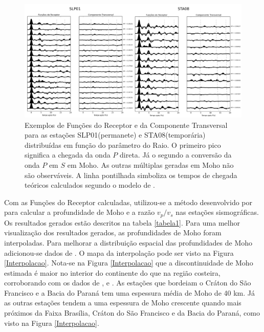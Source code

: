 \begin{figure}[!ht]
\centering
\includegraphics[scale=0.16]{Figs/RF_SLP01_STA08.png}
\caption[Exemplos de Funções do Receptor e da Componente Transversal para as estações SLP01(permanete) e STA08(temporária) distribuídas em função do parâmetro do Raio.]{Exemplos de Funções do Receptor e da Componente Transversal para as estações SLP01(permanete) e STA08(temporária) distribuídas em função do parâmetro do Raio. O primeiro pico significa a chegada da onda $P$ direta. Já o segundo a conversão da onda $P$ em $S$ em Moho. As outras múltiplas geradas em Moho não são observáveis. A linha pontilhada simboliza os tempos de chegada teóricos calculados segundo o modelo de \cite{kennet_iaspei_1991}.}
\label{RF_SLP01_STA08}
\end{figure}

Com as Funções do Receptor calculadas, utilizou-se a método desenvolvido por \cite{Zhu_Kanamori_2000} para calcular a profundidade de Moho e a razão $v_{p}/v_{s}$ nas estações sismográficas. Os resultados gerados estão descritos na tabela \ref{tabela1}. Para uma melhor visualização dos resultados gerados, as profundidades de Moho foram interpoladas. Para melhorar a distribuição espacial das profundidades de Moho adicionou-se dados de \cite{Assumpcao_Brazil_2013}. O mapa da interpolação pode ser visto na Figura \ref{Interpolacao}. Nota-se na Figura \ref{Interpolacao} que a discontinuidade de Moho estimada é maior no interior do continente do que na região costeira, corroborando com os dados de \cite{Assumpcao_America_2013}, \citep{Assumpcao_Brazil_2013} e \cite{van_der_meijde_gravity_2013}. As estações que bordeiam o Cráton do São Francisco e a Bacia do Paraná tem uma espessura média de Moho de 40 km. Já as outras estações tendem a uma espessura de Moho crescente quando mais próximos da Faixa Brasília, Cráton do São Francisco e da Bacia do Paraná, como visto na Figura \ref{Interpolacao}.

